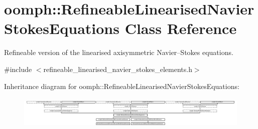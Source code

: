 \hypertarget{classoomph_1_1RefineableLinearisedNavierStokesEquations}{}\section{oomph\+:\+:Refineable\+Linearised\+Navier\+Stokes\+Equations Class Reference}
\label{classoomph_1_1RefineableLinearisedNavierStokesEquations}


Refineable version of the linearised axisymmetric Navier--Stokes equations.  




{\ttfamily \#include $<$refineable\+\_\+linearised\+\_\+navier\+\_\+stokes\+\_\+elements.\+h$>$}

Inheritance diagram for oomph\+:\+:Refineable\+Linearised\+Navier\+Stokes\+Equations\+:\begin{figure}[H]
\begin{center}
\leavevmode
\includegraphics[height=1.590909cm]{classoomph_1_1RefineableLinearisedNavierStokesEquations}
\end{center}
\end{figure}
